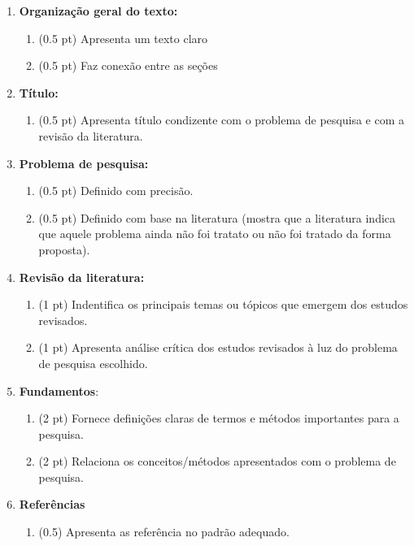 \documentclass[12pt,a4paper, brazil]{article}
\begin{document}
\begin{enumerate}
    \item \textbf{Organização geral do texto:}
        \begin{enumerate}
            \item (0.5 pt) Apresenta um texto claro
            \item (0.5 pt) Faz conexão entre as seções
        \end{enumerate}
    \item \textbf{Título:} 
    \begin{enumerate}
        \item (0.5 pt) Apresenta título condizente com o problema de pesquisa e com a revisão da literatura.
    \end{enumerate}
    \item \textbf{Problema de pesquisa:} 
        \begin{enumerate}
            \item (0.5 pt) Definido com precisão.
            \item (0.5 pt) Definido com base na literatura (mostra que a literatura indica que aquele problema ainda não foi tratato ou não foi tratado da forma proposta). 
        \end{enumerate}
    \item \textbf{Revisão da literatura:} 
        \begin{enumerate}
            \item (1 pt) Indentifica os principais temas ou tópicos que emergem dos estudos revisados.
            \item (1 pt) Apresenta análise crítica dos estudos revisados à luz do problema de pesquisa escolhido.
        \end{enumerate}
    \item \textbf{Fundamentos}:
        \begin{enumerate}
            \item (2 pt) Fornece definições claras de termos e métodos importantes para a pesquisa.
            \item (2 pt) Relaciona os conceitos/métodos apresentados com o problema de pesquisa.  
        \end{enumerate}
    \item \textbf{Referências}
        \begin{enumerate}
            \item (0.5) Apresenta as referência no padrão adequado. 
        \end{enumerate}
\end{enumerate}
\end{document}

